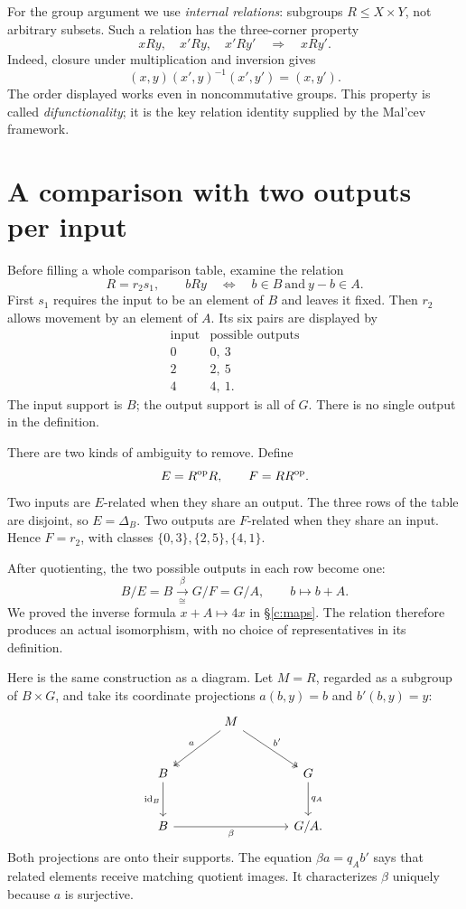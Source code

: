 For the group argument we use \emph{internal relations}: subgroups
\(R\leq X\times Y\), not arbitrary subsets. Such a relation has the
three-corner property
\[
 xRy,\quad x'Ry,\quad x'Ry'
 \quad\Longrightarrow\quad xRy'.
\]
Indeed, closure under multiplication and inversion gives
\[
 (x,y)(x',y)^{-1}(x',y')=(x,y').
\]
The order displayed works even in noncommutative groups. This property is
called \emph{difunctionality}; it is the key relation identity supplied by
the Mal'cev framework.


\clearpage
\section{A comparison with two outputs per input}\label{c:one-cell}
Before filling a whole comparison table, examine the relation
\[
 R=r_2s_1,\qquad bRy\quad\Longleftrightarrow\quad
 b\in B\ \text{and}\ y-b\in A.
\]
First \(s_1\) requires the input to be an element of \(B\) and leaves it
fixed. Then \(r_2\) allows movement by an element of \(A\). Its six pairs are
displayed by
\[
\begin{array}{c|c}
 \text{input}&\text{possible outputs}\\ \hline
 0&0,\ 3\\
 2&2,\ 5\\
 4&4,\ 1 .
\end{array}
\]
The input support is \(B\); the output support is all of \(G\).
There is no single output in the definition.

There are two kinds of ambiguity to remove. Define
\[
 E=R^{\mathrm{op}} R,\qquad F=RR^{\mathrm{op}}.
\]
Two inputs are \(E\)-related when they share an output. The three rows of
the table are disjoint, so \(E=\Delta_B\). Two outputs are \(F\)-related
when they share an input. Hence \(F=r_2\), with classes
\(\{0,3\},\{2,5\},\{4,1\}\).

After quotienting, the two possible outputs in each row become one:
\[
 B/E=B\xrightarrow[\cong]{\ \beta\ }G/F=G/A,\qquad b\longmapsto b+A.
\]
We proved the inverse formula \(x+A\mapsto4x\) in §\ref{c:maps}.
The relation therefore produces an actual isomorphism, with no choice
of representatives in its definition.

Here is the same construction as a diagram. Let \(M=R\), regarded as a
subgroup of \(B\times G\), and take its coordinate projections
\(a(b,y)=b\) and \(b'(b,y)=y\):
\[
\begin{tikzcd}[row sep=large,column sep=large]
 &M\arrow[dl,two heads,"a"']\arrow[dr,two heads,"b'"]&\\
 B\arrow[d,"\id_B"']&&G\arrow[d,"q_A"]\\
 B\arrow[rr,"\beta"']&&G/A .
\end{tikzcd}
\]
Both projections are onto their supports. The equation
\(\beta a=q_A b'\) says that related elements receive matching quotient
images. It characterizes \(\beta\) uniquely because \(a\) is surjective.

